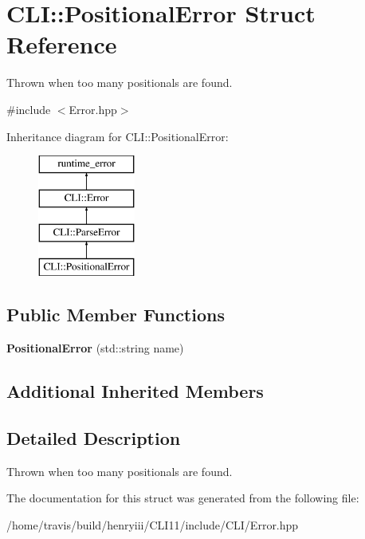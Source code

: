 \hypertarget{struct_c_l_i_1_1_positional_error}{}\section{C\+LI\+:\+:Positional\+Error Struct Reference}
\label{struct_c_l_i_1_1_positional_error}


Thrown when too many positionals are found.  




{\ttfamily \#include $<$Error.\+hpp$>$}

Inheritance diagram for C\+LI\+:\+:Positional\+Error\+:\begin{figure}[H]
\begin{center}
\leavevmode
\includegraphics[height=4.000000cm]{struct_c_l_i_1_1_positional_error}
\end{center}
\end{figure}
\subsection*{Public Member Functions}
\begin{DoxyCompactItemize}
\item 
\mbox{\label{struct_c_l_i_1_1_positional_error_acc0293ac28470702df76736c4beee449}} 
{\bfseries Positional\+Error} (std\+::string name)
\end{DoxyCompactItemize}
\subsection*{Additional Inherited Members}


\subsection{Detailed Description}
Thrown when too many positionals are found. 

The documentation for this struct was generated from the following file\+:\begin{DoxyCompactItemize}
\item 
/home/travis/build/henryiii/\+C\+L\+I11/include/\+C\+L\+I/Error.\+hpp\end{DoxyCompactItemize}
